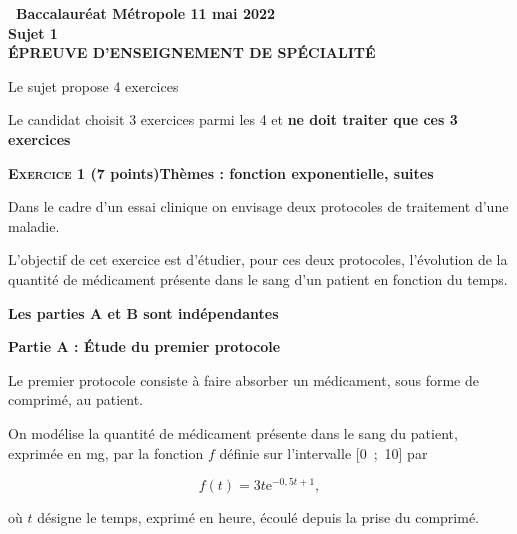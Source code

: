 \documentclass[11pt,a4paper,french]{article}
\begin{document}
\setlength\parindent{0mm}
\pagestyle{fancy}
\thispagestyle{empty}

\begin{center}{\Large\textbf{\decofourleft~Baccalauréat Métropole 11 mai 2022~\decofourright\\[6pt]  Sujet 1\\[7pt] ÉPREUVE D'ENSEIGNEMENT DE SPÉCIALITÉ}}
\end{center}

\vspace{0,25cm}

Le sujet propose 4 exercices

Le candidat choisit 3 exercices parmi les 4 et \textbf{ne doit traiter que ces 3 exercices}

\bigskip

\textbf{\textsc{Exercice 1} \quad (7 points)\hfill Thèmes : fonction exponentielle, suites}

\medskip

Dans le cadre d'un essai clinique on envisage deux protocoles de traitement 
d'une maladie.

L'objectif de cet exercice est d'étudier, pour ces deux protocoles, l'évolution de la quantité de médicament présente dans le sang d'un patient en fonction du temps.

\medskip

\textbf{Les parties A et B sont indépendantes}

\medskip

\textbf{Partie A : Étude du premier protocole}

\medskip

Le premier protocole consiste à faire absorber un médicament, sous forme de comprimé, au patient.

On modélise la quantité de médicament présente dans le sang du patient, exprimée en mg, par la fonction $f$ définie sur l'intervalle [0~;~10] par 

\[f(t) = 3t\text{e}^{-0,5t+1},\]

où $t$ désigne le temps, exprimé en heure, écoulé depuis la prise du comprimé.

\medskip
\end{document}
